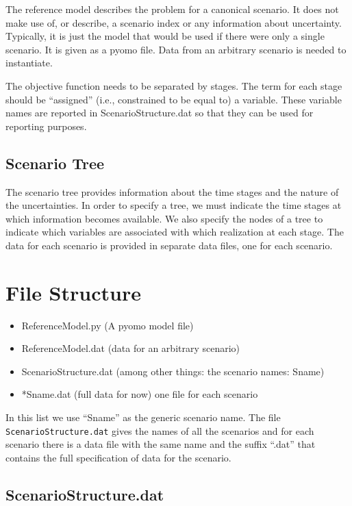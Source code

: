 The reference model describes the problem for a canonical scenario. It does not
make use of, or describe, a scenario index or any information about uncertainty.
Typically, it is just the model that would be used if there were only a single
scenario. It is given as a pyomo file. Data from an arbitrary scenario is needed
to instantiate.

The objective function needs to be separated by stages. The term for each stage
should be ``assigned'' (i.e., constrained to be equal to) a variable. These
variable names are reported in ScenarioStructure.dat so that they can be used
for reporting purposes.

\subsection{Scenario Tree}

The scenario tree provides information about the time stages and the nature of
the uncertainties. In order to specify a tree, we must indicate the time stages
at which information becomes available. We also specify the nodes of a tree to
indicate which variables are associated with which realization at each stage.
The data for each scenario is provided in separate data files, one for each
scenario.

\section{File Structure}

\begin{itemize}
\item ReferenceModel.py  (A pyomo model file)
\item ReferenceModel.dat (data for an arbitrary scenario)
\item ScenarioStructure.dat (among other things: the scenario names: Sname)
\item *Sname.dat   (full data for now) one file for each scenario
\end{itemize}

In this list we use ``Sname'' as the generic scenario name. The file
\verb|ScenarioStructure.dat| gives the names of all the scenarios and for each
scenario there is a data file with the same name and the suffix ``.dat'' that
contains the full specification of data for the scenario.

\subsection{ScenarioStructure.dat}

